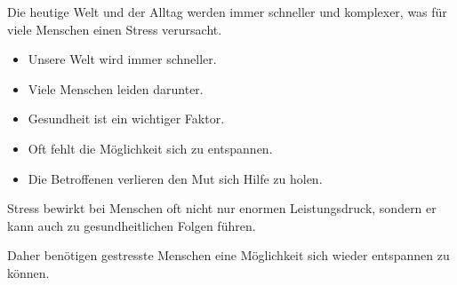 \begin{spacing}{1}
    
    Die heutige Welt und der Alltag werden immer schneller und komplexer, 
    was für viele Menschen einen Stress verursacht. 

    \begin{itemize}
        \item Unsere Welt wird immer schneller.
        \item Viele Menschen leiden darunter.
        \item Gesundheit ist ein wichtiger Faktor.
        \item Oft fehlt die Möglichkeit sich zu entspannen.
        \item Die Betroffenen verlieren den Mut sich Hilfe zu holen.
    \end{itemize}

    Stress bewirkt bei Menschen oft nicht nur enormen Leistungsdruck, sondern er kann auch zu gesundheitlichen 
    Folgen führen. 

    Daher benötigen gestresste Menschen eine Möglichkeit sich wieder entspannen zu können.

\end{spacing}
